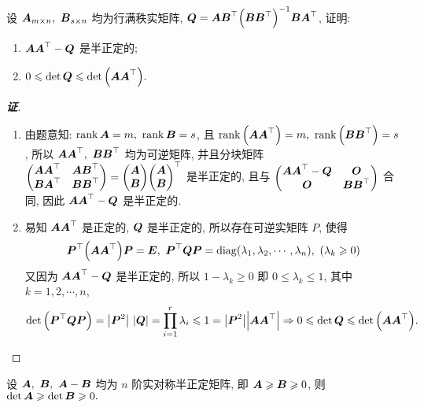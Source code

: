\begin{example}[1994 华中师范大学]
    设 $\vb*{A}_{m\times n},~\vb*{B}_{s\times n}$ 均为行满秩实矩阵, $\vb*{Q}=\vb*{AB}^\top\qty(\vb*{BB}^\top)^{-1}\vb*{BA}^\top$, 证明:
    \begin{enumerate}[label=(\arabic{*})]
        \item $\vb*{AA}^\top-\vb*{Q}$ 是半正定的;
        \item $0\leqslant \det\vb*{Q}\leqslant \det\qty(\vb*{AA}^\top).$
    \end{enumerate}
\end{example}
\begin{proof}[{\songti \textbf{证}}]
    \begin{enumerate}[label=(\arabic{*})]
        \item 由题意知: $\rank\vb*{A}=m,~\rank\vb*{B}=s$, 且 $\rank\qty(\vb*{AA}^\top)=m,~\rank\qty(\vb*{BB}^\top)=s$, 
              所以 $\vb*{AA}^\top,~\vb*{BB}^\top$ 均为可逆矩阵, 并且分块矩阵 $\mqty(\vb*{AA}^\top&\vb*{AB}^\top\\\vb*{BA}^\top&\vb*{BB}^\top)=\mqty(\vb*{A}\\\vb*{B})\mqty(\vb*{A}\\\vb*{B})^\top$ 是半正定的, 且与 $\mqty(\vb*{AA}^\top-\vb*{Q}&\vb*{O}\\\vb*{O}&\vb*{BB}^\top)$ 合同, 
              因此 $\vb*{AA}^\top-\vb*{Q}$ 是半正定的.
        \item 易知 $\vb*{AA}^\top$ 是正定的, $\vb*{Q}$ 是半正定的, 所以存在可逆实矩阵 $P$, 使得 $$\vb*{P}^\top\qty(\vb*{AA}^\top)\vb*{P}=\vb*{E},~\vb*{P}^\top\vb*{QP}=\mathrm{diag}(\lambda_1,\lambda_2,\cdots,\lambda_n),~(\lambda_k\geqslant 0)$$
              又因为 $\vb*{AA}^\top-\vb*{Q}$ 是半正定的, 所以 $1-\lambda_k\geqslant 0$ 即 $0\leqslant \lambda_k\leqslant 1$, 其中 $k=1,2,\cdots,n$, 
              $$\det\qty(\vb*{P}^\top\vb*{QP})=\qty|\vb*{P}^2|~\qty|\vb*{Q}|=\prod_{i=1}^{r}\lambda_i\leqslant 1=\qty|\vb*{P}^2|\qty|\vb*{AA}^\top|\Rightarrow 0\leqslant \det\vb*{Q}\leqslant \det\qty(\vb*{AA}^\top).$$
    \end{enumerate}
\end{proof}

\begin{inference}[实对称半正定矩阵的单调性]
    设 $\vb*{A},~\vb*{B},~\vb*{A}-\vb*{B}$ 均为 $n$ 阶实对称半正定矩阵, 即 $\vb*{A}\geqslant \vb*{B}\geqslant 0$, 则 $\det\vb*{A}\geqslant \det\vb*{B}\geqslant 0.$
\end{inference}

